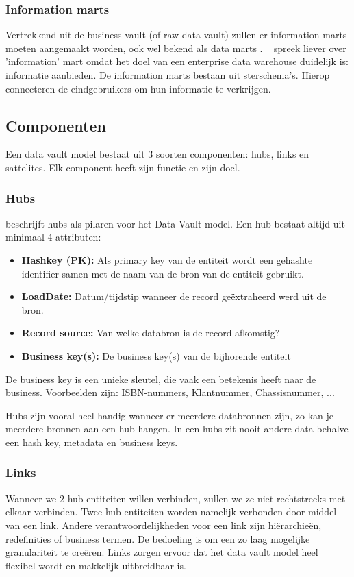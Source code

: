 \subsubsection{Information marts}
Vertrekkend uit de business vault (of raw data vault) zullen er information marts moeten aangemaakt worden, ook wel bekend als data marts . ~\textcite{Linstedt2016} spreek liever over 'information' mart omdat het doel van een enterprise data warehouse duidelijk is: informatie aanbieden. 
De information marts bestaan uit sterschema's. Hierop connecteren de eindgebruikers om hun informatie te verkrijgen. 

\subsection{Componenten}
Een data vault model bestaat uit 3 soorten componenten: hubs, links en sattelites. Elk component heeft zijn functie en zijn doel.

\subsubsection{Hubs}
\textcite{Linstedt2016} beschrijft hubs als pilaren voor het Data Vault model. Een hub bestaat altijd uit minimaal 4 attributen:

\begin{itemize}
	\item \textbf{Hashkey (PK):} Als primary key van de entiteit wordt een gehashte identifier samen met de naam van de bron van de entiteit gebruikt.
	\item \textbf{LoadDate:} Datum/tijdstip wanneer de record geëxtraheerd werd uit de bron.
	\item \textbf{Record source:} Van welke databron is de record afkomstig?
	\item \textbf{Business key(s):} De business key(s) van de bijhorende entiteit
\end{itemize} 

 De business key is een unieke sleutel, die vaak een betekenis heeft naar de business. Voorbeelden zijn: ISBN-nummers, Klantnummer, Chassisnummer, ...
 
 Hubs zijn vooral heel handig wanneer er meerdere databronnen zijn, zo kan je meerdere bronnen aan een hub hangen. In een hubs zit nooit andere data behalve een hash key, metadata en business keys.

\subsubsection{Links}
Wanneer we 2 hub-entiteiten willen verbinden, zullen we ze niet rechtstreeks met elkaar verbinden. Twee hub-entiteiten worden namelijk verbonden door middel van een link. Andere verantwoordelijkheden voor een link zijn hiërarchieën, redefinities of business termen. De bedoeling is om een zo laag mogelijke granulariteit te creëren. Links zorgen ervoor dat het data vault model heel flexibel wordt en makkelijk uitbreidbaar is. 

